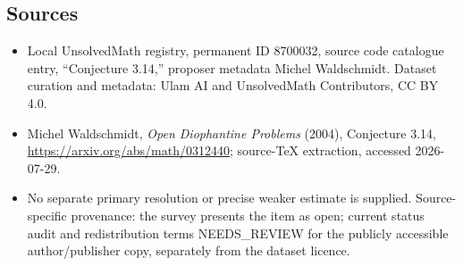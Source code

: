 \documentclass[11pt]{article}
\begin{document}
\subsection{Sources}
\begin{itemize}
\item Local UnsolvedMath registry, permanent ID 8700032, source code catalogue entry, ``Conjecture 3.14,'' proposer metadata Michel Waldschmidt. Dataset curation and metadata: Ulam AI and UnsolvedMath Contributors, CC BY 4.0.
\item Michel Waldschmidt, \emph{Open Diophantine Problems} (2004), Conjecture 3.14, \url{https://arxiv.org/abs/math/0312440}; source-TeX extraction, accessed 2026-07-29.
\item No separate primary resolution or precise weaker estimate is supplied. Source-specific provenance: the survey presents the item as open; current status audit and redistribution terms NEEDS\_REVIEW for the publicly accessible author/publisher copy, separately from the dataset licence.
\end{itemize}
\end{document}
